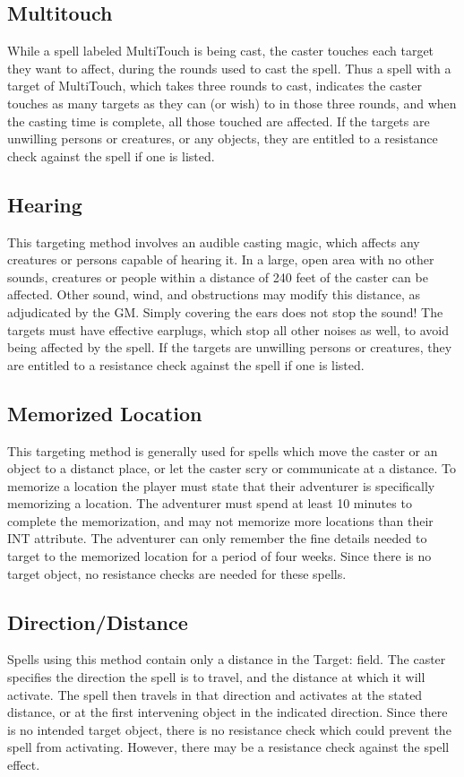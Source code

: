 \begin{multicols*}{2}
\subsection{Multitouch}
 While a spell labeled MultiTouch is being cast, the
caster touches each target they want to affect, during the rounds used to cast the spell. Thus a spell with a target of MultiTouch, which takes three rounds to cast, indicates the caster touches as many targets as they can (or wish) to in those three rounds, and when the casting time is complete, all those touched are affected. If the targets are unwilling persons or creatures, or any objects, they are entitled to a resistance check against the spell if one is listed.
\subsection{Hearing}
 This targeting method involves an audible casting magic, which affects any creatures or persons capable of hearing it. In a large, open area with no other sounds,  creatures or people within a distance of 240 feet of the caster can be affected. Other sound, wind, and obstructions may modify this distance, as adjudicated by the GM. Simply covering the ears does not stop the sound! The targets must have effective earplugs, which stop all other noises as well, to avoid being affected by the spell. If the targets are unwilling persons or creatures, they are entitled to a resistance check against the spell if one is listed.
\subsection{Memorized Location}
 This targeting method is generally used for spells which move the caster or an object to a distanct place, or let the caster scry or communicate at a distance. To memorize a location the player must state that their adventurer is specifically memorizing a location. The adventurer must spend at least 10 minutes to complete the memorization, and may not memorize more locations than their INT attribute. The adventurer can only remember the fine details needed to target to the memorized location for a period of four weeks. Since there is no target object, no resistance checks are needed for these spells.
\subsection{Direction/Distance}
 Spells using this method contain only a distance in the Target: field. The caster specifies the direction the spell is to travel, and the distance at which it will activate. The spell then travels in that direction and activates at the stated distance, or at the first intervening object in the indicated direction. Since there is no intended target object, there is no resistance check which could prevent the spell from activating. However, there may be a resistance check against the spell effect.

\end{multicols*}
